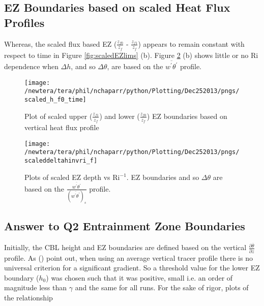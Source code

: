 \clearpage

\subsection{\acs{EZ} Boundaries based on scaled Heat Flux Profiles}

Whereas, the scaled flux based \acs{EZ} ($\frac{z_{f0}}{z_{f}}$ - $\frac{z_{f1}}{z_{f}}$) appears to remain constant 
with respect to time in Figure \ref{fig:scaledEZlims} (b). Figure \ref{fig:deltahinvri_scaled} (b) shows little or no \acs{Ri} dependence when $\Delta h$, and so $\Delta \theta$, are based on the $\overline{w^{'}\theta^{'}}$ profile. 

\begin{figure}[htbp]
    \centering
\texttt{[image: /newtera/tera/phil/nchaparr/python/Plotting/Dec252013/pngs/scaled\_h\_f0\_time]}              
\caption{Plot of scaled upper ($\frac{z_{f1}}{z_{f}}$) and lower ($\frac{z_{f0}}{z_{f}}$) \acs{EZ} boundaries based on vertical heat flux profile}
    \label{fig:scaledEZlims1}   %
\end{figure}

\begin{figure}[htbp]
    \centering
    \texttt{[image: /newtera/tera/phil/nchaparr/python/Plotting/Dec252013/pngs/scaleddeltahinvri\_f]}
    \caption[scaled \acs{EZ} depth vs \acs{Ri}$^{-1}$ based on the vertical heat flux profile]{Plots of scaled \acs{EZ} depth vs \acs{Ri}$^{-1}$. \acs{EZ} boundaries and so $\Delta \theta$ are based on the $\frac{\overline{w^{'}\theta^{'}}}{(\overline{w^{'}\theta^{'}})_{s}}$ profile.}
    \label{fig:deltahinvri_scaled}   %
\end{figure}

\clearpage

\subsection{Answer to Q2 Entrainment Zone Boundaries}

Initially, the \acs{CBL} height and \acs{EZ} boundaries are defined based on the vertical  $\frac{\partial \overline{\theta}}{\partial z}$ profile.  As \citeauthor{BrooksFowler2} (\citeyear{BrooksFowler2}) point out, when using an average vertical tracer profile there is no universal criterion for a significant gradient.  So a threshold value for the lower \acs{EZ} boundary ($h_{0}$) was chosen such that it was positive, small i.e. an order of magnitude less than $\gamma$ and the same for all runs.  For the sake of rigor, plots of the relationship

